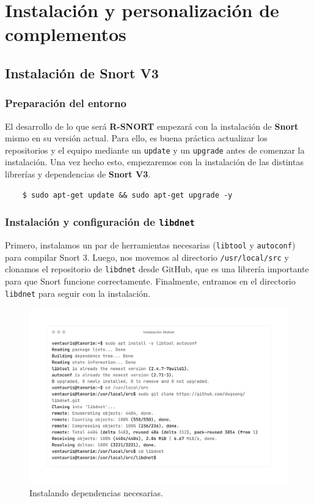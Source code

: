 \documentclass[11pt,a4paper,twoside]{report}
\begin{document}
\newpage

\section{Instalación y personalización de complementos}
\subsection{Instalación de Snort V3}

\subsubsection*{Preparación del entorno}

El desarrollo de lo que será \textbf{R-SNORT} empezará con la instalación de \textbf{Snort} \cite{snort3_installation_pdf} mismo en su versión actual. Para ello, es buena práctica actualizar los repositorios y el equipo mediante un \texttt{update} y un \texttt{upgrade} antes de comenzar la instalación. Una vez hecho esto, empezaremos con la instalación de las distintas librerías y dependencias de \textbf{Snort V3}.

\begin{lstlisting}
	$ sudo apt-get update && sudo apt-get upgrade -y
\end{lstlisting}

\subsubsection*{Instalación y configuración de \texttt{libdnet}}

Primero, instalamos un par de herramientas necesarias (\texttt{libtool} y \texttt{autoconf}) para compilar Snort 3. Luego, nos movemos al directorio \texttt{/usr/local/src} y clonamos el repositorio de \texttt{libdnet} desde GitHub, que es una librería importante para que Snort funcione correctamente. Finalmente, entramos en el directorio \texttt{libdnet} para seguir con la instalación.

\begin{figure}[H]
	\centering
	\includegraphics[scale=0.12]{instalacion_snort/1-1.png}
	\caption{Instalando dependencias necesarias.}
\end{figure}
\end{document}
